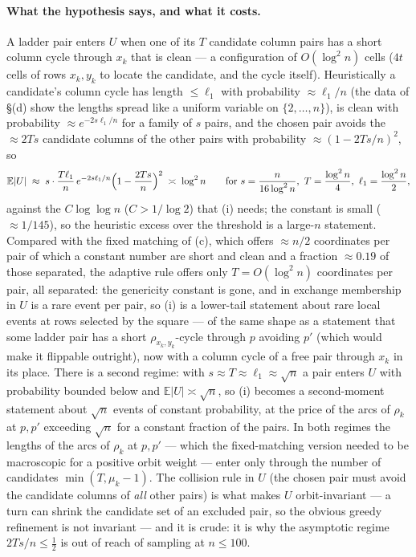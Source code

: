 \documentclass[11pt]{article}
\theoremstyle{definition}
\newcommand{\E}{\mathbb{E}}
\begin{document}
\paragraph{What the hypothesis says, and what it costs.}  A ladder pair enters $U$ when one
of its $T$ candidate column pairs has a short column cycle through $x_k$ that is clean ---
a configuration of $O(\log^2n)$ cells ($4t$ cells of rows $x_k,y_k$ to locate the
candidate, and the cycle itself).  Heuristically a candidate's column cycle has length
$\le\ell_1$ with probability $\approx\ell_1/n$ (the data of \S(d) show the lengths spread
like a uniform variable on $\{2,\dots,n\}$), is clean with probability
$\approx e^{-2s\ell_1/n}$ for a family of $s$ pairs, and the chosen pair avoids the
$\approx2Ts$ candidate columns of the other pairs with probability $\approx(1-2Ts/n)^2$, so
\[
\E|U|\;\approx\;s\cdot\frac{T\ell_1}{n}\,e^{-2s\ell_1/n}\Bigl(1-\frac{2Ts}n\Bigr)^2\;\asymp\;\log^2n
\qquad\text{for }s=\frac n{16\log^2n},\ T=\frac{\log^2n}4,\ \ell_1=\frac{\log^2n}2,
\]
against the $C\log\log n$ ($C>1/\log2$) that (i) needs; the constant is small
($\approx1/145$), so the heuristic excess over the threshold is a large-$n$ statement.  Compared with the fixed matching
of (c), which offers $\approx n/2$ coordinates per pair of which a constant number are short
and clean and a fraction $\approx0.19$ of those separated, the adaptive rule offers only
$T=O(\log^2n)$ coordinates per pair, all separated: the genericity constant is gone, and in
exchange membership in $U$ is a rare event per pair, so (i) is a lower-tail statement about
rare local events at rows selected by the square --- of the same shape as a statement that
some ladder pair has a short $\rho_{x_k,y_k}$-cycle through $p$ avoiding $p'$ (which would
make it flippable outright), now with a column cycle of a free pair through $x_k$ in its
place.  There is a second regime:
with $s\approx T\approx\ell_1\approx\sqrt n$ a pair enters $U$ with probability bounded
below and $\E|U|\asymp\sqrt n$, so (i) becomes a second-moment statement about $\sqrt n$
events of constant probability, at the price of the arcs of $\rho_k$ at $p,p'$ exceeding
$\sqrt n$ for a constant fraction of the pairs.  In both regimes the lengths of the arcs of $\rho_k$ at $p,p'$ --- which the
fixed-matching version needed to be macroscopic for a positive orbit weight --- enter only
through the number of candidates $\min(T,\mu_k-1)$.  The collision rule in $U$ (the chosen pair must avoid the candidate
columns of \emph{all} other pairs) is what makes $U$ orbit-invariant --- a turn can shrink
the candidate set of an excluded pair, so the obvious greedy refinement is not invariant ---
and it is crude: it is why the asymptotic regime $2Ts/n\le\tfrac12$ is out of reach of
sampling at $n\le100$.
\end{document}
